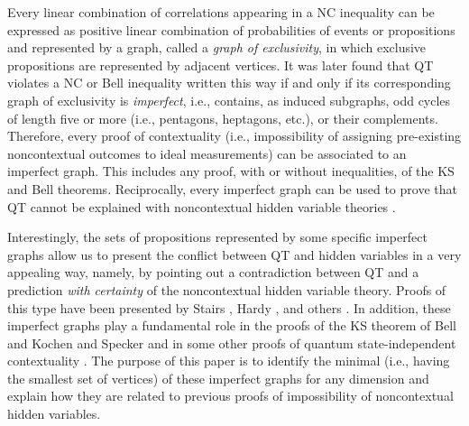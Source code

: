 \documentclass[%
 twocolumn,
 groupedaddress,
 showpacs,
 showkeys,
 preprintnumbers,
 amsmath,amssymb,
 aps,
 pra,
 longbibliography,
 floatfix,
 ]{revtex4-1}
\begin{document}
Every linear combination of correlations appearing in a NC inequality can be expressed as positive linear combination of probabilities of events or propositions and represented by a graph, called a {\em graph of exclusivity}, in which exclusive propositions are represented by adjacent vertices. It was later found \cite{CSW10,CSW14,CDLP13} that QT violates a NC or Bell inequality written this way if and only if its corresponding graph of exclusivity is {\em imperfect}, i.e., contains, as induced subgraphs, odd cycles of length five or more (i.e., pentagons, heptagons, etc.), or their complements. Therefore, every proof of contextuality (i.e., impossibility of assigning pre-existing noncontextual outcomes to ideal measurements) can be associated to an imperfect graph. This includes any proof, with or without inequalities, of the KS \cite{Specker60,KS65,KS67} and Bell \cite{Bell66} theorems. Reciprocally, every imperfect graph can be used to prove that QT cannot be explained with noncontextual hidden variable theories \cite{CSW10,CSW14}.

Interestingly, the sets of propositions represented by some specific imperfect graphs allow us to present the conflict between QT and hidden variables in a very appealing way, namely, by pointing out a contradiction between QT and a prediction {\em with certainty} of the noncontextual hidden variable theory. Proofs of this type have been presented by Stairs \cite{Stairs83}, Hardy \cite{Hardy93}, and others \cite{Clifton93,CG95,CT11,CBTB13}. In addition, these imperfect graphs play a fundamental role in the proofs of the KS theorem of Bell \cite{Bell66} and Kochen and Specker \cite{KS67} and in some other proofs of quantum state-independent contextuality \cite{YO12,CKP16}. The purpose of this paper is to identify the minimal (i.e., having the smallest set of vertices) of these imperfect graphs for any dimension and explain how they are related to previous proofs of impossibility of noncontextual hidden variables.
\end{document}
